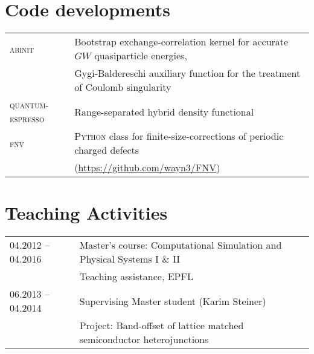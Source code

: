 \documentclass[a4paper, 11pt, DIV=15,headings=normal]{scrartcl}
\begin{document}
\section*{Code developments}
\begin{tabular}{ll}
\textsc{abinit}  & Bootstrap exchange-correlation kernel for accurate $GW$ quasiparticle energies, \\
                 & Gygi-Baldereschi auxiliary function for the treatment of
Coulomb singularity \\
\textsc{quantum-espresso} & Range-separated hybrid density functional \\
\textsc{fnv}     & \textsc{Python} class for finite-size-corrections of
periodic charged defects \\
                 & (\url{https://github.com/wayn3/FNV})
\\
\end{tabular} 

\section*{Teaching Activities}
\begin{tabular}{ll}
04.2012 -- 04.2016 & Master's course: Computational Simulation and Physical Systems I \& II \\
                   & Teaching assistance, EPFL\\
06.2013 -- 04.2014 & Supervising Master student (Karim Steiner) \\
                   & Project: Band-offset of lattice matched semiconductor heterojunctions 
\end{tabular}
\end{document}
